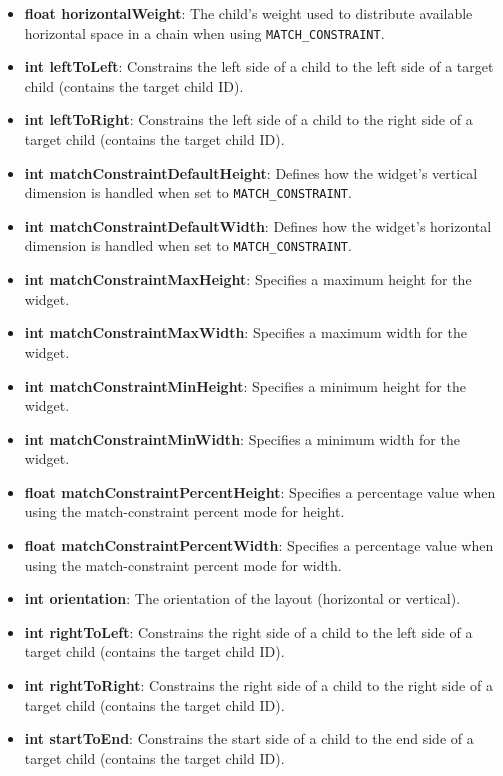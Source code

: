 \documentclass{report}
\begin{document}
\begin{itemize}
\begin{itemize}
                \item \textbf{float horizontalWeight}: The child’s weight used to distribute available horizontal space in a chain when using \texttt{MATCH\_CONSTRAINT}.
                \item \textbf{int leftToLeft}: Constrains the left side of a child to the left side of a target child (contains the target child ID).
                \item \textbf{int leftToRight}: Constrains the left side of a child to the right side of a target child (contains the target child ID).
                \item \textbf{int matchConstraintDefaultHeight}: Defines how the widget’s vertical dimension is handled when set to \texttt{MATCH\_CONSTRAINT}.
                \item \textbf{int matchConstraintDefaultWidth}: Defines how the widget’s horizontal dimension is handled when set to \texttt{MATCH\_CONSTRAINT}.
                \item \textbf{int matchConstraintMaxHeight}: Specifies a maximum height for the widget.
                \item \textbf{int matchConstraintMaxWidth}: Specifies a maximum width for the widget.
                \item \textbf{int matchConstraintMinHeight}: Specifies a minimum height for the widget.
                \item \textbf{int matchConstraintMinWidth}: Specifies a minimum width for the widget.
                \item \textbf{float matchConstraintPercentHeight}: Specifies a percentage value when using the match-constraint percent mode for height.
                \item \textbf{float matchConstraintPercentWidth}: Specifies a percentage value when using the match-constraint percent mode for width.
                \item \textbf{int orientation}: The orientation of the layout (horizontal or vertical).
                \item \textbf{int rightToLeft}: Constrains the right side of a child to the left side of a target child (contains the target child ID).
                \item \textbf{int rightToRight}: Constrains the right side of a child to the right side of a target child (contains the target child ID).
                \item \textbf{int startToEnd}: Constrains the start side of a child to the end side of a target child (contains the target child ID).

\end{itemize}
\end{itemize}
\end{document}
